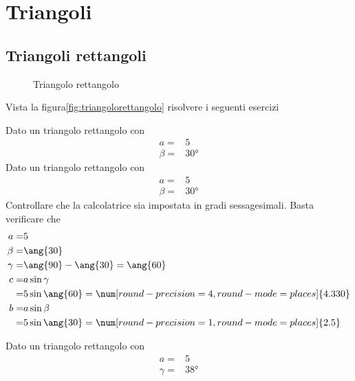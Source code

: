\tcbstartrecording
\chapter{Triangoli}
\label{cha:trigonometriatriangoli}
 \section{Triangoli rettangoli}
 \begin{figure}
	\centering
	
	\caption{Triangolo rettangolo}
	\label{fig:triangolorettangolo}
\end{figure}

Vista la figura\nobs\vref{fig:triangolorettangolo} risolvere i seguenti esercizi
 \tcbstartrecording
 \begin{exercise}
 	Dato un triangolo rettangolo con
 	\begin{align*}
 	a=&5\\
 	\beta=&\ang{30}
 	\end{align*}
\tcblower
	Dato un triangolo rettangolo con
\begin{align*}
a=&5\\
\beta=&\ang{30}
\end{align*}
Controllare che la calcolatrice sia impostata in gradi sessagesimali.
Basta verificare che \testgradi 
\begin{align*}
a=&5\\
\beta=&\ang{30}\\
\gamma=&\ang{90}-\ang{30}=\ang{60}\\
c=&a\sin\gamma\\
=& 5\sin\ang{60}=\num[round-precision=\lungarrotandamento,round-mode=places]{4.330}\\
b=&a\sin\beta\\
=& 5\sin\ang{30}=\num[round-precision=1,round-mode=places]{2.5}
\end{align*}
 \end{exercise}
 \begin{exercise}[no solution]
 	 	Dato un triangolo rettangolo con
 	\begin{align*}
 	a=&5\\
 	\gamma=&\ang{38}
 	\end{align*}
 \end{exercise}
